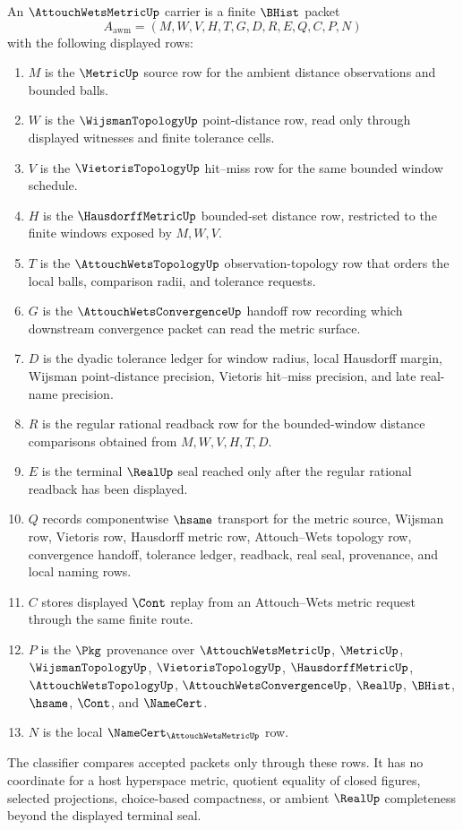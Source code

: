 \begin{definition}
\label{def:attouch-wets-metric-carrier}
An $\AttouchWetsMetricUp$ carrier is a finite $\BHist$ packet
$$
A_{\mathrm{awm}}=(M,W,V,H,T,G,D,R,E,Q,C,P,N)
$$
with the following displayed rows:
\begin{enumerate}
\item $M$ is the $\MetricUp$ source row for the ambient distance observations and bounded balls.
\item $W$ is the $\WijsmanTopologyUp$ point-distance row, read only through displayed witnesses and finite tolerance cells.
\item $V$ is the $\VietorisTopologyUp$ hit--miss row for the same bounded window schedule.
\item $H$ is the $\HausdorffMetricUp$ bounded-set distance row, restricted to the finite windows exposed by $M,W,V$.
\item $T$ is the $\AttouchWetsTopologyUp$ observation-topology row that orders the local balls, comparison radii, and tolerance requests.
\item $G$ is the $\AttouchWetsConvergenceUp$ handoff row recording which downstream convergence packet can read the metric surface.
\item $D$ is the dyadic tolerance ledger for window radius, local Hausdorff margin, Wijsman point-distance precision, Vietoris hit--miss precision, and late real-name precision.
\item $R$ is the regular rational readback row for the bounded-window distance comparisons obtained from $M,W,V,H,T,D$.
\item $E$ is the terminal $\RealUp$ seal reached only after the regular rational readback has been displayed.
\item $Q$ records componentwise $\hsame$ transport for the metric source, Wijsman row, Vietoris row, Hausdorff metric row, Attouch--Wets topology row, convergence handoff, tolerance ledger, readback, real seal, provenance, and local naming rows.
\item $C$ stores displayed $\Cont$ replay from an Attouch--Wets metric request through the same finite route.
\item $P$ is the $\Pkg$ provenance over $\AttouchWetsMetricUp$, $\MetricUp$, $\WijsmanTopologyUp$, $\VietorisTopologyUp$, $\HausdorffMetricUp$, $\AttouchWetsTopologyUp$, $\AttouchWetsConvergenceUp$, $\RealUp$, $\BHist$, $\hsame$, $\Cont$, and $\NameCert$.
\item $N$ is the local $\NameCert_{\AttouchWetsMetricUp}$ row.
\end{enumerate}
The classifier compares accepted packets only through these rows. It has no coordinate for a host hyperspace metric, quotient equality of closed figures, selected projections, choice-based compactness, or ambient $\RealUp$ completeness beyond the displayed terminal seal.
\end{definition}

